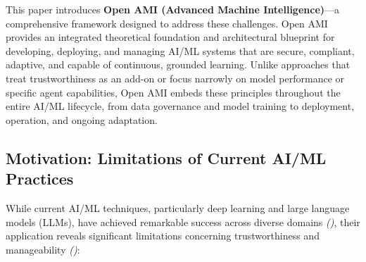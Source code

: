 \documentclass[12pt,a4paper]{report}
\renewcommand{\citep}[1]{\textit{\scriptsize{(\cite{#1})}}}
\begin{document}
	This paper introduces \textbf{Open AMI (Advanced Machine Intelligence)}—a comprehensive framework designed to address these challenges. Open AMI provides an integrated theoretical foundation and architectural blueprint for developing, deploying, and managing AI/ML systems that are secure, compliant, adaptive, and capable of continuous, grounded learning. Unlike approaches that treat trustworthiness as an add-on or focus narrowly on model performance or specific agent capabilities, Open AMI embeds these principles throughout the entire AI/ML lifecycle, from data governance and model training to deployment, operation, and ongoing adaptation.
	
	\subsection{Motivation: Limitations of Current AI/ML Practices}
	\label{sec:1-1}
	While current AI/ML techniques, particularly deep learning and large language models (LLMs), have achieved remarkable success across diverse domains \citep{AdditionalCitationRef8, Xie2025LLMAgentsSurvey}, their application reveals significant limitations concerning trustworthiness and manageability \citep{Bandam2025, AdditionalCitationRef33}:
	
\end{document}
